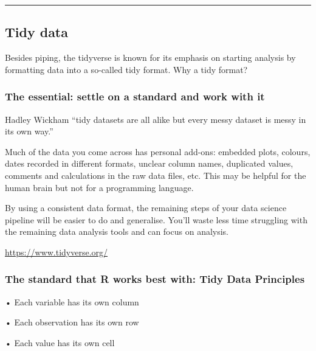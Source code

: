 \documentclass[
]{article}
\begin{document}
\begin{center}\rule{0.5\linewidth}{0.5pt}\end{center}

\hypertarget{tidy-data}{%
\subsection{Tidy data}\label{tidy-data}}

Besides piping, the tidyverse is known for its emphasis on starting
analysis by formatting data into a so-called tidy format. Why a tidy
format?

\hypertarget{the-essential-settle-on-a-standard-and-work-with-it}{%
\subsubsection{\texorpdfstring{\textbf{The essential: settle on a
standard and work with
it}}{The essential: settle on a standard and work with it}}\label{the-essential-settle-on-a-standard-and-work-with-it}}

Hadley Wickham ``tidy datasets are all alike but every messy dataset is
messy in its own way.''

Much of the data you come across has personal add-ons: embedded plots,
colours, dates recorded in different formats, unclear column names,
duplicated values, comments and calculations in the raw data files, etc.
This may be helpful for the human brain but not for a programming
language.

By using a consistent data format, the remaining steps of your data
science pipeline will be easier to do and generalise. You'll waste less
time struggling with the remaining data analysis tools and can focus on
analysis.

\url{https://www.tidyverse.org/}

\hypertarget{the-standard-that-r-works-best-with-tidy-data-principles}{%
\subsubsection{\texorpdfstring{\textbf{The standard that R works best
with: Tidy Data
Principles}}{The standard that R works best with: Tidy Data Principles}}\label{the-standard-that-r-works-best-with-tidy-data-principles}}

• Each variable has its own column

• Each observation has its own row

• Each value has its own cell
\end{document}
